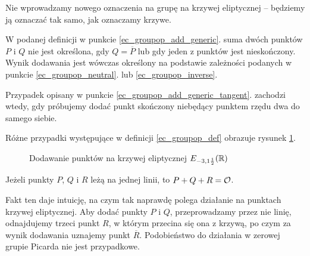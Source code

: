 \begin{remark}
Nie wprowadzamy nowego oznaczenia na grupę na krzywej eliptycznej --
będziemy ją oznaczać tak samo, jak oznaczamy krzywe.
\end{remark}

\begin{remark}
W podanej definicji w punkcie \ref{ec_groupop_add_generic}.
suma dwóch punktów $P$ i $Q$
nie jest określona, gdy $Q = \overline{P}$
lub gdy jeden z punktów jest nieskończony.
Wynik dodawania jest wówczas określony
na podstawie zależności podanych w punkcie
\ref{ec_groupop_neutral}. lub \ref{ec_groupop_inverse}.
\end{remark}

\begin{remark}
Przypadek opisany w punkcie \ref{ec_groupop_add_generic_tangent}.
zachodzi wtedy,
gdy próbujemy dodać punkt skończony niebędący punktem rzędu dwa
do samego siebie.
\end{remark}

\begin{remark}
Różne przypadki występujące w definicji \ref{ec_groupop_def}
obrazuje rysunek \ref{ec_groupop_fig}.

\begin{figure}[h]
\centering
{}
\hspace{1cm}
\hspace{1cm}
\hspace{1cm}
\caption{Dodawanie punktów na krzywej eliptycznej $E_{-3,1\frac{1}{2}}(\mathbb{R})$}
\label{ec_groupop_fig}
\end{figure}
\end{remark}

\begin{fact}
Jeżeli punkty $P$, $Q$ i $R$ leżą na jednej linii,
to $P + Q + R = \mathcal{O}$.
\end{fact}

\noindent
Fakt ten daje intuicję, na czym tak naprawdę polega działanie
na punktach krzywej eliptycznej.
Aby dodać punkty $P$ i $Q$, przeprowadzamy przez nie linię,
odnajdujemy trzeci punkt $R$,
w którym przecina się ona z krzywą,
po czym za wynik dodawania uznajemy punkt $\overline{R}$.
Podobieństwo do działania w zerowej grupie Picarda nie jest przypadkowe.

